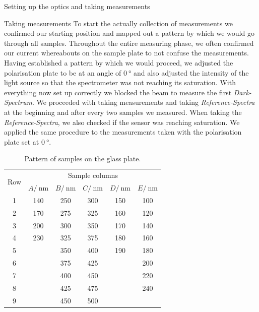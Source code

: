 \documentclass[pdftex, a4paper,11pt, twoside, UKenglish]{report}
\begin{document}
\begin{chapter}{Setting up the optics and taking measurements}
    
    
    \begin{section}{Taking measurements}
      \label{chp:SetupMeasuring}
      To start the actually collection of measurements we confirmed our starting
      position and mapped out a pattern by which we would go through all
      samples. Throughout the entire measuring phase, we often confirmed our
      current whereabouts on the sample plate to not confuse the measurements.
      Having established a pattern by which we would proceed, we adjusted the
      polarisation plate to be at an angle of $\SI{0}{\degree}$ and also
      adjusted the intensity of the light source so that the spectrometer was
      not reaching its saturation. \newline
      With everything now set up correctly we blocked the beam to measure the
      first \textit{Dark-Spectrum}. We proceeded with taking measurements and
      taking \textit{Reference-Spectra} at the beginning and after every two
      samples we measured. When taking the \textit{Reference-Spectra}, we also
      checked if the sensor was reaching saturation. \newline
      We applied the same procedure to the measurements taken with the
      polarisation plate set at $\SI{0}{\degree}$.
      
      \begin{table}[htbp]
        \centering
        \begin{tabular}{|c|c|c|c|c|c|}
          \hline
          \multirow{2}{*}{Row} & \multicolumn{5}{|c|}{Sample columns} 
          \\ \cline{2-6}
          & $A /\SI{}{\nano\meter}$ & $B /\SI{}{\nano\meter}$ &
          $C /\SI{}{\nano\meter}$ & $D /\SI{}{\nano\meter}$ &
          $E /\SI{}{\nano\meter}$\\ \hline \hline 
          1 & 140 & 250 & 300 & 150 & 100 \\ \hline 
          2 & 170 & 275 & 325 & 160 & 120 \\ \hline 
          3 & 200 & 300 & 350 & 170 & 140 \\ \hline 
          4 & 230 & 325 & 375 & 180 & 160 \\ \hline 
          5 &  & 350 & 400 & 190 & 180 \\ \hline 
          6 &  & 375 & 425 &  & 200 \\ \hline 
          7 &  & 400 & 450 &  & 220 \\ \hline 
          8 &  & 425 & 475 &  & 240 \\ \hline 
          9 &  & 450 & 500 &  &  \\ \hline 
        \end{tabular}
        \caption{Pattern of samples on the glass plate.}
        \label{tab:samplepattern}
      \end{table}
      

\end{section}
\end{chapter}
\end{document}

